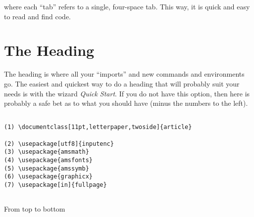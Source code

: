 \documentclass[11pt,letterpaper,twoside,titlepage]{article}
\begin{document}
		where each ``tab'' refers to a single, four-space tab.  This way, it is quick and easy to read and find code.
		
	\section{The Heading}
	
		The heading is where all your ``imports'' and new commands and environments go.  The easiest and quickest way to do a heading that will probably suit your needs is with the wizard \emph{Quick Start}.  If you do not have this option, then here is probably a safe bet as to what you should have (minus the numbers to the left). 
		
		\begin{verbatim}
			
(1) \documentclass[11pt,letterpaper,twoside]{article}

(2) \usepackage[utf8]{inputenc}
(3) \usepackage{amsmath}
(4) \usepackage{amsfonts}
(5) \usepackage{amssymb}
(6) \usepackage{graphicx}
(7) \usepackage[in]{fullpage}
			
		\end{verbatim}
		
		From top to bottom
		
\end{document}
